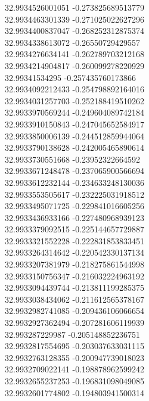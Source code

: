 {32.9934526001051	-0.273825689513779\\
32.9934463301339	-0.271025022627296\\
32.9934400837047	-0.268252312875374\\
32.9934338613072	-0.26550729429557\\
32.9934276634141	-0.262789703212168\\
32.9934214904817	-0.260099278220929\\
32.99341534295	-0.257435760173866\\
32.9934092212433	-0.254798892164016\\
32.9934031257703	-0.252188419510262\\
32.9933970569244	-0.249604089742184\\
32.9933910150843	-0.247045652584917\\
32.9933850006139	-0.244512859944064\\
32.9933790138628	-0.242005465890614\\
32.9933730551668	-0.23952322664592\\
32.9933671248478	-0.237065900566694\\
32.9933612232144	-0.234633248130036\\
32.9933553505617	-0.232225031918512\\
32.9933495071725	-0.229841016605256\\
32.9933436933166	-0.227480968939123\\
32.9933379092515	-0.225144657729887\\
32.9933321552228	-0.222831853833451\\
32.9933264314642	-0.220542330137134\\
32.9933207381979	-0.218275861544998\\
32.9933150756347	-0.216032224963192\\
32.9933094439744	-0.213811199285375\\
32.9933038434062	-0.211612565378167\\
32.9932982741085	-0.209436106066654\\
32.9932927362494	-0.207281606119939\\
32.993287229987	-0.205148852236751\\
32.9932817554695	-0.203037633031115\\
32.9932763128355	-0.200947739018023\\
32.9932709022141	-0.198878962599242\\
32.9932655237253	-0.196831098049085\\
32.9932601774802	-0.194803941500314\\
}
